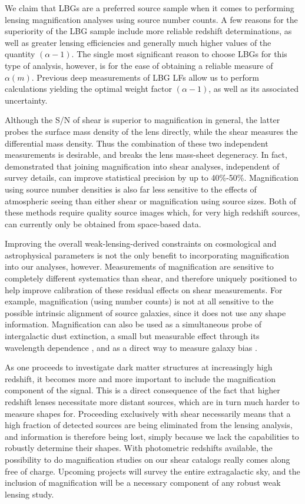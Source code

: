 \documentclass[iop]{emulateapj}
\begin{document}
We claim that LBGs are a preferred source sample when it comes to performing lensing magnification analyses using source number counts. A few reasons for the superiority of the LBG sample include more reliable redshift determinations, as well as greater lensing efficiencies and generally much higher values of the quantity $(\alpha-1)$. The single most significant reason to choose LBGs for this type of analysis, however, is for the ease of obtaining a reliable measure of $\alpha(m)$. Previous deep measurements of LBG LFs allow us to perform calculations yielding the optimal weight factor $(\alpha-1)$, as well as its associated uncertainty.

Although the S/N of shear is superior to magnification in general, the latter probes the surface mass density of the lens directly, while the shear measures the differential mass density. Thus the combination of these two independent measurements is desirable, and breaks the lens mass-sheet degeneracy. In fact, \citet{RozoSchmidt10} demonstrated that joining magnification into shear analyses, independent of survey details, can improve statistical precision by up to 40\%-50\%. Magnification using source number densities is also far less sensitive to the effects of atmospheric seeing than either shear or magnification using source sizes. Both of these methods require quality source images which, for very high redshift sources, can currently only be obtained from space-based data.

Improving the overall weak-lensing-derived constraints on cosmological and astrophysical parameters is not the only benefit to incorporating magnification into our analyses, however. Measurements of magnification are sensitive to completely different systematics than shear, and therefore uniquely positioned to help improve calibration of these residual effects on shear measurements. For example, magnification (using number counts) is not at all sensitive to the possible intrinsic alignment of source galaxies, since it does not use any shape information. Magnification can also be used as a simultaneous probe of intergalactic dust extinction, a small but measurable effect through its wavelength dependence \citep{Menard10}, and as a direct way to measure galaxy bias \citep{Waerbeke10}.

As one proceeds to investigate dark matter structures at increasingly high redshift, it becomes more and more important to include the magnification component of the signal. This is a direct consequence of the fact that higher redshift lenses necessitate more distant sources, which are in turn much harder to measure shapes for. Proceeding exclusively with shear necessarily means that a high fraction of detected sources are being eliminated from the lensing analysis, and information is therefore being lost, simply because we lack the capabilities to robustly determine their shapes. With photometric redshifts available, the possibility to do magnification studies on our shear catalogs really comes along free of charge. Upcoming projects will survey the entire extragalactic sky, and the inclusion of magnification will be a necessary component of any robust weak lensing study.
\end{document}
